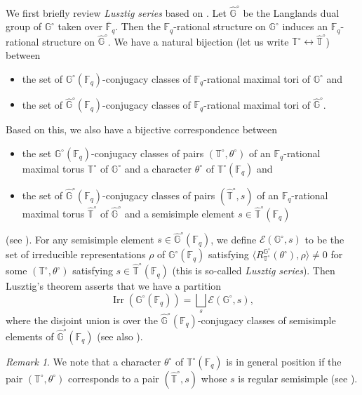 \documentclass{amsart}
\newcommand{\bbT}{\mathbb{T}}
\newcommand{\F}{\mathbb{F}}
\newcommand{\bbG}{\mathbb{G}}
\DeclareMathOperator{\Irr}{Irr}
\theoremstyle{plain}
\theoremstyle{definition}
\theoremstyle{remark}
\newtheorem{rem}[thm]{Remark}
\theoremstyle{theorem}
\begin{document}
We first briefly review \textit{Lusztig series} based on \cite[Section 2.5]{GM20}.
Let $\hat{\bbG}^{\circ}$ be the Langlands dual group of $\bbG^{\circ}$ taken over $\overline{\F}_{q}$.
Then the $\F_{q}$-rational structure on $\bbG^{\circ}$ induces an $\F_{q}$-rational structure on $\hat{\bbG}^{\circ}$.
We have a natural bijection (let us write $\bbT^{\circ}\leftrightarrow\hat{\bbT}^{\circ}$) between
\begin{itemize}
\item
the set of $\bbG^{\circ}(\F_{q})$-conjugacy classes of $\F_{q}$-rational maximal tori of $\bbG^{\circ}$ and
\item
the set of $\hat{\bbG}^{\circ}(\F_{q})$-conjugacy classes of $\F_{q}$-rational maximal tori of $\hat{\bbG}^{\circ}$.
\end{itemize}
Based on this, we also have a bijective correspondence between
\begin{itemize}
\item
the set $\bbG^{\circ}(\F_{q})$-conjugacy classes of pairs $(\bbT^{\circ},\theta^{\circ})$ of an $\F_{q}$-rational maximal torus $\bbT^{\circ}$ of $\bbG^{\circ}$ and a character $\theta^{\circ}$ of $\bbT^{\circ}(\F_{q})$ and 
\item
the set of $\hat{\bbG}^{\circ}(\F_{q})$-conjugacy classes of pairs $(\hat{\bbT}^{\circ},s)$ of an $\F_{q}$-rational maximal torus $\hat{\bbT}^{\circ}$ of $\hat{\bbG}^{\circ}$ and a semisimple element $s\in\hat{\bbT}^{\circ}(\F_{q})$
\end{itemize} 
(see \cite[Definition 2.5.17]{GM20}).
For any semisimple element $s\in\hat{\bbG}^{\circ}(\F_{q})$, we define $\mathcal{E}(\bbG^{\circ},s)$ to be the set of irreducible representations $\rho$ of $\bbG^{\circ}(\F_{q})$ satisfying $\langle R_{\bbT^{\circ}}^{\bbG^{\circ}}(\theta^{\circ}),\rho\rangle\neq0$ for some $(\bbT^{\circ},\theta^{\circ})$ satisfying $s\in\hat{\bbT}^{\circ}(\F_{q})$ (this is so-called \textit{Lusztig series}).
Then Lusztig's theorem \cite[7.6]{Lus77} asserts that we have a partition
\[
\Irr(\bbG^{\circ}(\F_{q}))
=
\bigsqcup_{s}\mathcal{E}(\bbG^{\circ},s),
\]
where the disjoint union is over the $\hat{\bbG}^{\circ}(\F_{q})$-conjugacy classes of semisimple elements of $\hat{\bbG}^{\circ}(\F_{q})$ (see also \cite[Theorem 2.6.2]{GM20}).

\begin{rem}
We note that a character $\theta^{\circ}$ of $\bbT^{\circ}(\F_{q})$ is in general position if the pair $(\bbT^{\circ},\theta^{\circ})$ corresponds to a pair $(\hat{\bbT}^{\circ},s)$ whose $s$ is regular semisimple (see \cite[Example 2.6.7]{GM20}).
\end{rem}
\end{document}
